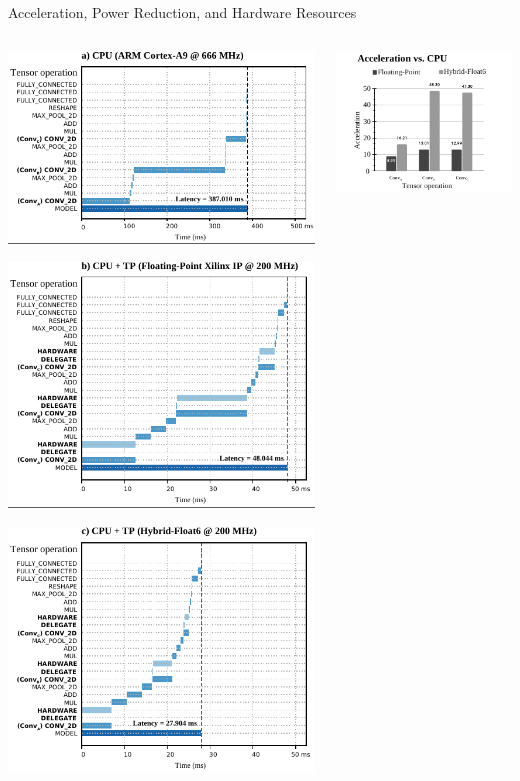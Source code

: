\begin{frame}{Acceleration, Power Reduction, and Hardware Resources}
	\begin{columns}[T] %
		\begin{column}{0.5\textwidth}
			\centering
			\includegraphics[width=0.5\linewidth]{slides/figures/runtime_a.pdf} %
			\pause %
			
			\includegraphics[width=0.5\linewidth]{slides/figures/runtime_b.pdf} %
			\pause %
			
			\includegraphics[width=0.5\linewidth]{slides/figures/runtime_c.pdf} %
			\pause %
		\end{column}
		
		\begin{column}{0.5\textwidth}
			\centering
			\includegraphics[width=0.5\linewidth]{slides/figures/acceleration_vs_cpu.pdf} %
			\pause %
			

\end{column}
\end{columns}
\end{frame}
